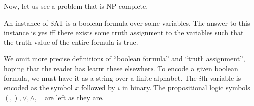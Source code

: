 	Now, let us see a problem that is \textsf{NP}-complete.

	\begin{fprob}
		An instance of \textsf{SAT} is a boolean formula over some variables. The answer to this instance is yes iff there exists some truth assignment to the variables such that the truth value of the entire formula is true.
	\end{fprob}

	We omit more precise definitions of ``boolean formula'' and ``truth assignment'', hoping that the reader has learnt these elsewhere. To encode a given boolean formula, we must have it as a string over a finite alphabet. The $i$th variable is encoded as the symbol $x$ followed by $i$ in binary. The propositional logic symbols $(,),\lor,\land,\neg$ are left as they are.


